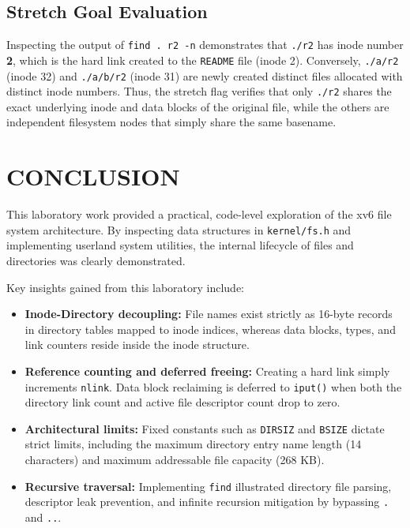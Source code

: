 \documentclass[12pt,a4paper]{report}
\numberwithin{equation}{chapter}
\numberwithin{figure}{chapter}
\numberwithin{table}{chapter}
\begin{document}
\section{Stretch Goal Evaluation}
Inspecting the output of \texttt{find . r2 -n} demonstrates that \texttt{./r2} has inode number \textbf{2}, which is the hard link created to the \texttt{README} file (inode 2). Conversely, \texttt{./a/r2} (inode 32) and \texttt{./a/b/r2} (inode 31) are newly created distinct files allocated with distinct inode numbers. Thus, the stretch flag verifies that only \texttt{./r2} shares the exact underlying inode and data blocks of the original file, while the others are independent filesystem nodes that simply share the same basename.

\chapter*{CONCLUSION}
This laboratory work provided a practical, code-level exploration of the xv6 file system architecture. By inspecting data structures in \texttt{kernel/fs.h} and implementing userland system utilities, the internal lifecycle of files and directories was clearly demonstrated.

Key insights gained from this laboratory include:
\begin{itemize}
    \item \textbf{Inode-Directory decoupling:} File names exist strictly as 16-byte records in directory tables mapped to inode indices, whereas data blocks, types, and link counters reside inside the inode structure.
    \item \textbf{Reference counting and deferred freeing:} Creating a hard link simply increments \texttt{nlink}. Data block reclaiming is deferred to \texttt{iput()} when both the directory link count and active file descriptor count drop to zero.
    \item \textbf{Architectural limits:} Fixed constants such as \texttt{DIRSIZ} and \texttt{BSIZE} dictate strict limits, including the maximum directory entry name length (14 characters) and maximum addressable file capacity (268 KB).
    \item \textbf{Recursive traversal:} Implementing \texttt{find} illustrated directory file parsing, descriptor leak prevention, and infinite recursion mitigation by bypassing \texttt{.} and \texttt{..}.
\end{itemize}
\end{document}
